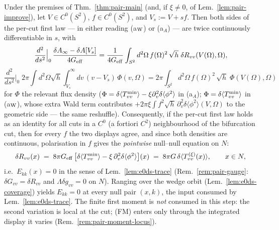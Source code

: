 \begin{proposition}
\label{prop:pair-secondvar}
Under the premises of Thm.~\ref{thm:pair-main} (and, if $\xi\neq0$,
of Lem.~\ref{lem:pair-improve}), let $V\in C^{0}(S^{2})$, $f\in
C^{0}(S^{2})$, and $V_{s}:=V+sf$. Then both sides of the per-cut
first law --- in either reading (a$_{\rm W}$) or (a$_{A}$) --- are
twice continuously differentiable in $s$, with
\[
\frac{d^{2}}{ds^{2}}\Big|_{0}\,
\frac{\delta A_{\infty}-\delta A[V_{s}]}{4G_{\rm eff}}
=\frac{1}{4G_{\rm eff}}\int_{S^{2}}d^{2}\Omega\,f(\Omega)^{2}\,
\sqrt h\;\delta R_{vv}(V(\Omega),\Omega),
\]
\[
\frac{d^{2}}{ds^{2}}\Big|_{0}\;
2\pi\!\int\!d^{2}\Omega\sqrt h\!\int_{V_{s}}^{\infty}\!\!dv\,(v-V_{s})
\,\Phi(v,\Omega)
=2\pi\int_{S^{2}}d^{2}\Omega\,f(\Omega)^{2}\,\sqrt h\;
\Phi(V(\Omega),\Omega)
\]
for $\Phi$ the relevant flux density ($\Phi=\delta\langle T^{\rm min}
_{vv}\rangle-\xi\partial_{v}^{2}\delta\langle\phi^{2}\rangle$ in
(a$_{A}$); $\Phi=\delta\langle T^{\rm min}_{vv}\rangle$ in
(a$_{\rm W}$), whose extra Wald term contributes
$+2\pi\xi\int f^{2}\sqrt h\,\partial_{v}^{2}\delta\langle\phi^{2}
\rangle(V,\Omega)$ to the geometric side --- the same reshuffle).
Consequently, if the per-cut first law holds as an identity for all
cuts in a $C^{0}$ (a fortiori $C^{2}$) neighbourhood of the
bifurcation cut, then for every $f$ the two displays agree, and since
both densities are continuous, polarisation in $f$ gives the
\emph{pointwise} null--null equation on $N$:
\[
\delta R_{vv}(x)\;=\;8\pi G_{\rm eff}\,
\bigl[\delta\langle T^{\rm min}_{vv}\rangle
-\xi\,\partial_{v}^{2}\delta\langle\phi^{2}\rangle\bigr](x)
\;=\;8\pi G\,\delta\langle T^{(\xi)}_{vv}(x)\rangle ,
\qquad x\in N,
\]
i.e.\ $E_{kk}(x)=0$ in the sense of Lem.~\ref{lem:e0ds-trace}
(Rem.~\ref{rem:pair-gauge}: $\delta G_{vv}=\delta R_{vv}$ and
$\Lambda\delta g_{vv}=0$ on $N$). Ranging over the wedge orbit
(Lem.~\ref{lem:e0ds-coverage}) yields $E_{kk}=0$ at every null pair
$(x,k)$, the input consumed by Lem.~\ref{lem:e0ds-trace}. The finite
first moment is \emph{not} consumed in this step: the second
variation is local at the cut; (FM) enters only through the
integrated display it varies (Rem.~\ref{rem:pair-moment-locus}).
\end{proposition}

